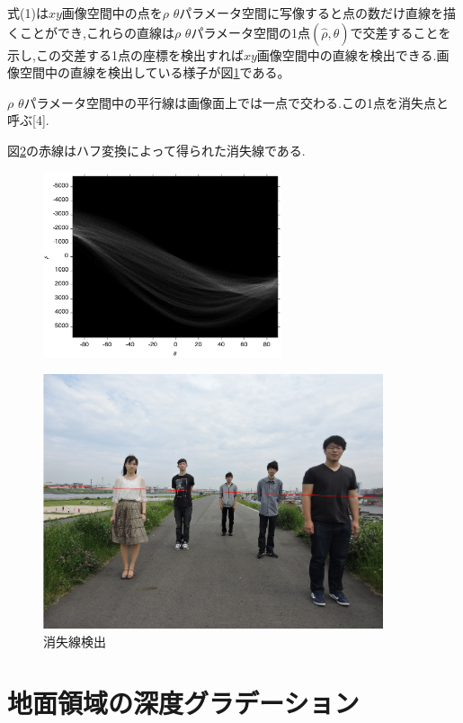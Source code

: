 \documentclass[technicalreport]{ieicej}
\begin{document}
式(1)は$xy$画像空間中の点を$\rho$ $\theta$パラメータ空間に写像すると点の数だけ直線を描くことができ,これらの直線は$\rho$ $\theta$パラメータ空間の1点$(\hat \rho,\hat \theta)$で交差することを示し,この交差する1点の座標を検出すれば$xy$画像空間中の直線を検出できる.画像空間中の直線を検出している様子が図\ref{fig5}である。


$\rho$ $\theta$パラメータ空間中の平行線は画像面上では一点で交わる.この1点を消失点と呼ぶ[4].

図\ref{fig6}の赤線はハフ変換によって得られた消失線である.
\begin{figure}[t]
\begin{center}
\includegraphics[width=7cm,clip]{hough.eps}
\caption{}
\label{fig5}
\end{center}
\end{figure}

\begin{figure}[t]
\begin{center}
\includegraphics[width=10cm, bb=0 0 1151 863]{fig4.png}
\caption{消失線検出}
\label{fig6}
\end{center}
\end{figure}


\section{地面領域の深度グラデーション}
\end{document}
